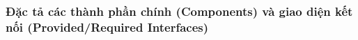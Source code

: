 \subsubsection{Đặc tả các thành phần chính (Components) và giao diện kết nối (Provided/Required Interfaces)}
